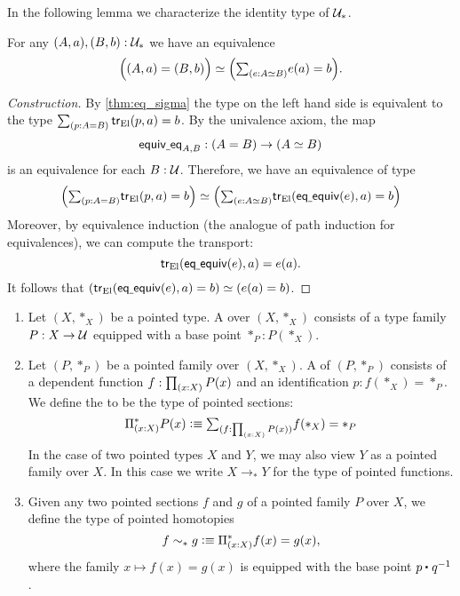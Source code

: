 In the following lemma we characterize the identity type of $\mathcal{U}_\ast$. 

\begin{lem}\label{lem:equiv_of_ptdtype}
For any $(A,a),(B,b):\mathcal{U}_\ast$ we have an equivalence
\begin{equation*}
\eqv{\Big(\pairr{A,a}=\pairr{B,b}\Big)}{\Big(\sm{e:\eqv{A}{B}}e(a)=b\Big)}.
\end{equation*}
\end{lem}

\begin{proof}[Construction]
By \cref{thm:eq_sigma} the type on the left hand side is
equivalent to the type $\sm{p:A=B}\tr_{\universalfam}({p},{a})=b$.
By the univalence axiom, the map 
\begin{equation*}
\equiveq_{A,B}:(A=B)\to (\eqv{A}{B})
\end{equation*}
is an equivalence for each $B:\mathcal{U}$. 
Therefore, we have an equivalence of type
\begin{equation*}
\eqv{\Big(\sm{p:A=B}\tr_{\universalfam}({p},{a})=b\Big)}{\Big(\sm{e:\eqv{A}{B}}\tr_{\universalfam}({\eqequiv(e)},{a})=b\Big)}
\end{equation*} 
Moreover, by equivalence induction (the analogue of path induction for 
equivalences), we can compute the transport:
\begin{equation*}
\mathsf{tr}_{\mathrm{El}}({\mathsf{eq\underline{\ }{}equiv}(e)},{a})=e(a).
\end{equation*}
It follows that $\eqv{(\tr_{\universalfam}({\eqequiv(e)},{a})=b)}
{(e(a)=b)}$.
\end{proof}

\begin{defn}
\begin{enumerate}
\item Let $(X,\ast_X)$ be a pointed type. A  over $(X,\ast_X)$ consists of a type family $P:X\to \mathcal{U}$ equipped with a base point $\ast_P:P(\ast_X)$. 
\item Let $(P,\ast_P)$ be a pointed family over $(X,\ast_X)$. A  of $(P,\ast_P)$ consists of a dependent function $f:\prd{x:X}P(x)$ and an identification $p:f(\ast_X)=\ast_P$. We define the  to be the type of pointed sections:
\begin{equation*}
\Pi^\ast_{(x:X)}P(x) \defeq \sm{f:\prd{x:X}P(x)}f(\ast_X)=\ast_P
\end{equation*}
In the case of two pointed types $X$ and $Y$, we may also view $Y$ as a pointed family over $X$. In this case we write $X\to_\ast Y$ for the type of pointed functions.
\item Given any two pointed sections $f$ and $g$ of a pointed family $P$ over $X$, we define the type of pointed homotopies
\begin{equation*}
f\sim_\ast g \vcentcolon\equiv \Pi^\ast_{(x:X)} f(x)=g(x),
\end{equation*}
where the family $x\mapsto f(x)=g(x)$ is equipped with the base point $\ct{p}{q^{-1}}$. 
\end{enumerate}
\end{defn}

